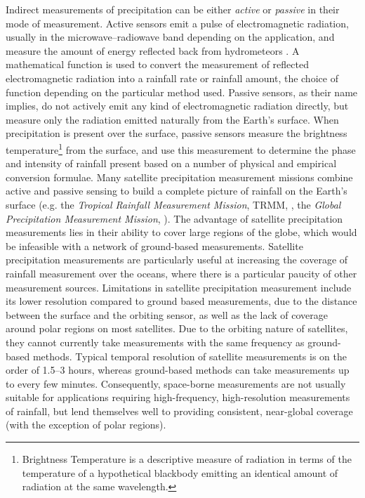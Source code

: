 Indirect measurements of precipitation can be either \textit{active} or \textit{passive} in their mode of measurement. Active sensors emit a pulse of electromagnetic radiation, usually in the microwave--radiowave band depending on the application, and measure the amount of energy reflected back from hydrometeors \citep{fabry2015radar}. A mathematical function is used to convert the measurement of reflected electromagnetic radiation into a rainfall rate or rainfall amount, the choice of function depending on the particular method used. Passive sensors, as their name implies, do not actively emit any kind of electromagnetic radiation directly, but measure only the radiation emitted naturally from the Earth's surface. When precipitation is present over the surface, passive sensors measure the brightness temperature\footnote{Brightness Temperature is a descriptive measure of radiation in terms of the temperature of a hypothetical blackbody emitting an identical amount of radiation at the same wavelength.} from the surface, and use this measurement to determine the phase and intensity of rainfall present based on a number of physical and empirical conversion formulae. Many satellite precipitation measurement missions combine active and passive sensing to build a complete picture of rainfall on the Earth's surface (e.g. the \textit{Tropical Rainfall Measurement Mission}, TRMM, \citet{simpson1988proposed}, the \textit{Global Precipitation Measurement Mission}, \citet{hou2014global}). The advantage of satellite precipitation measurements lies in their ability to cover large regions of the globe, which would be infeasible with a network of ground-based measurements. Satellite precipitation measurements are particularly useful at increasing the coverage of rainfall measurement over the oceans, where there is a particular paucity of other measurement sources. Limitations in satellite precipitation measurement include its lower resolution compared to ground based measurements, due to the distance between the surface and the orbiting sensor, as well as the lack of coverage around polar regions on most satellites. Due to the orbiting nature of satellites, they cannot currently take measurements with the same frequency as ground-based methods. Typical temporal resolution of satellite measurements is on the order of 1.5--3 hours, whereas ground-based methods can take measurements up to every few minutes. Consequently, space-borne measurements are not usually suitable for applications requiring high-frequency, high-resolution measurements of rainfall, but lend themselves well to providing consistent, near-global coverage (with the exception of polar regions). 

